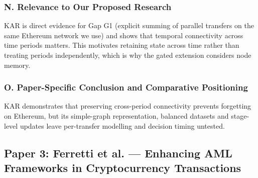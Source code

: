 \documentclass[11pt,a4paper]{article}
\begin{document}
\subsubsection*{N. Relevance to Our Proposed Research}
KAR is direct evidence for Gap G1 (explicit summing of parallel transfers on the same Ethereum network we use) and shows that temporal connectivity across time periods matters. This motivates retaining state across time rather than treating periods independently, which is why the gated extension considers node memory.

\subsubsection*{O. Paper-Specific Conclusion and Comparative Positioning}
KAR demonstrates that preserving cross-period connectivity prevents forgetting on Ethereum, but its simple-graph representation, balanced datasets and stage-level updates leave per-transfer modelling and decision timing untested.

\subsection{Paper 3: Ferretti et al. --- Enhancing AML Frameworks in Cryptocurrency Transactions}
\label{sec:p3_ferretti}
\end{document}
